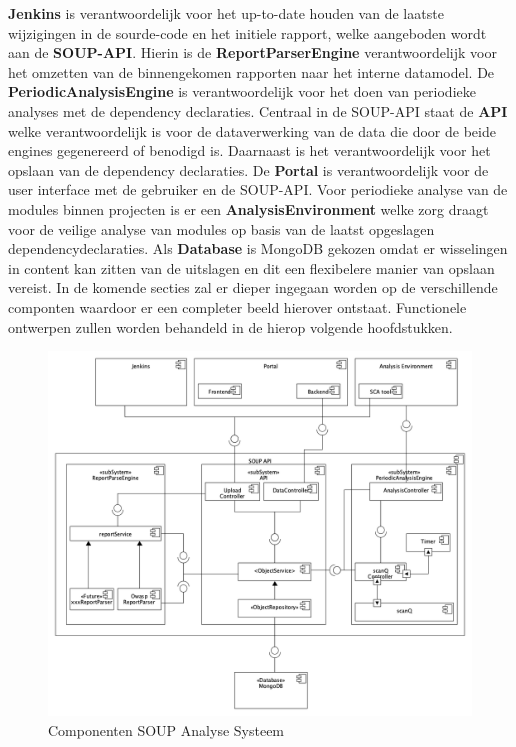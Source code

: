 \textbf{Jenkins} is verantwoordelijk voor het up-to-date houden van de laatste wijzigingen in de sourde-code en het initiele rapport, welke aangeboden wordt aan de \textbf{SOUP-API}. Hierin is de  \textbf{ReportParserEngine} verantwoordelijk voor het omzetten van de binnengekomen rapporten naar het interne datamodel. De \textbf{PeriodicAnalysisEngine} is verantwoordelijk voor het doen van periodieke analyses met de dependency declaraties. Centraal in de SOUP-API staat de \textbf{API} welke verantwoordelijk is voor de dataverwerking van de data die door de beide engines gegenereerd of benodigd is. Daarnaast is het verantwoordelijk voor het opslaan van de dependency declaraties. De \textbf{Portal} is verantwoordelijk voor de user interface met de gebruiker en de SOUP-API. Voor periodieke analyse van de modules binnen projecten is er een \textbf{AnalysisEnvironment} welke zorg draagt voor de veilige analyse van modules op basis van de laatst opgeslagen dependencydeclaraties. Als \textbf{Database} is MongoDB gekozen omdat er wisselingen in content kan zitten van de uitslagen en dit een flexibelere manier van opslaan vereist.
In de komende secties zal er dieper ingegaan worden op de verschillende componten waardoor er een completer beeld hierover ontstaat. Functionele ontwerpen zullen worden behandeld in de hierop volgende hoofdstukken.

\begin{figure}[bth]
    \myfloatalign
    \includegraphics[width=17cm]{gfx/umlet/exports/ApplicationComponents}
    \caption{Componenten SOUP Analyse Systeem}
    \label{fig:SOUP-Components}
\end{figure}
\clearpage


